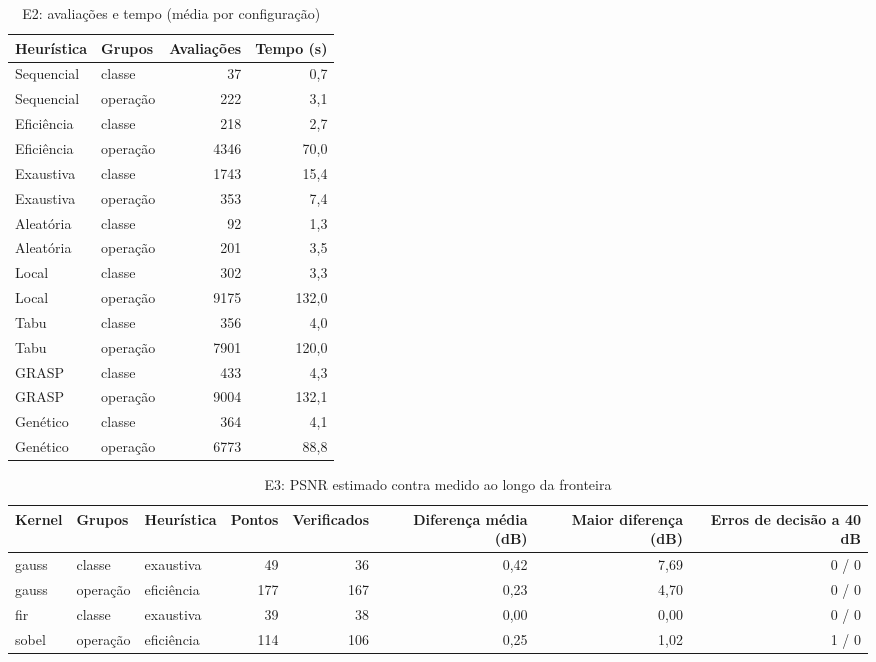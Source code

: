 \begin{table}[htbp]
\centering
\caption{E2: avaliações e tempo (média por configuração)}
\begin{tabular}{|l|l|r|r|}
\hline
\rowcolor{tabAzul}\color{white}Heurística & \color{white}Grupos & \color{white}Avaliações & \color{white}Tempo (s) \\
\hline
Sequencial & classe & 37 & 0,7 \\ \hline
Sequencial & operação & 222 & 3,1 \\ \hline
Eficiência & classe & 218 & 2,7 \\ \hline
Eficiência & operação & 4346 & 70,0 \\ \hline
Exaustiva & classe & 1743 & 15,4 \\ \hline
Exaustiva & operação & 353 & 7,4 \\ \hline
Aleatória & classe & 92 & 1,3 \\ \hline
Aleatória & operação & 201 & 3,5 \\ \hline
Local & classe & 302 & 3,3 \\ \hline
Local & operação & 9175 & 132,0 \\ \hline
Tabu & classe & 356 & 4,0 \\ \hline
Tabu & operação & 7901 & 120,0 \\ \hline
GRASP & classe & 433 & 4,3 \\ \hline
GRASP & operação & 9004 & 132,1 \\ \hline
Genético & classe & 364 & 4,1 \\ \hline
Genético & operação & 6773 & 88,8 \\ \hline
\end{tabular}
\end{table}
\begin{table}[htbp]
\centering
\caption{E3: PSNR estimado contra medido ao longo da fronteira}
\begin{tabular}{|l|l|l|r|r|r|r|r|}
\hline
\rowcolor{tabAzul}\color{white}Kernel & \color{white}Grupos & \color{white}Heurística & \color{white}Pontos & \color{white}Verificados & \color{white}Diferença média (dB) & \color{white}Maior diferença (dB) & \color{white}Erros de decisão a 40 dB \\
\hline
gauss & classe & exaustiva & 49 & 36 & 0,42 & 7,69 & 0 / 0 \\ \hline
gauss & operação & eficiência & 177 & 167 & 0,23 & 4,70 & 0 / 0 \\ \hline
fir & classe & exaustiva & 39 & 38 & 0,00 & 0,00 & 0 / 0 \\ \hline
sobel & operação & eficiência & 114 & 106 & 0,25 & 1,02 & 1 / 0 \\ \hline
\end{tabular}
\end{table}

